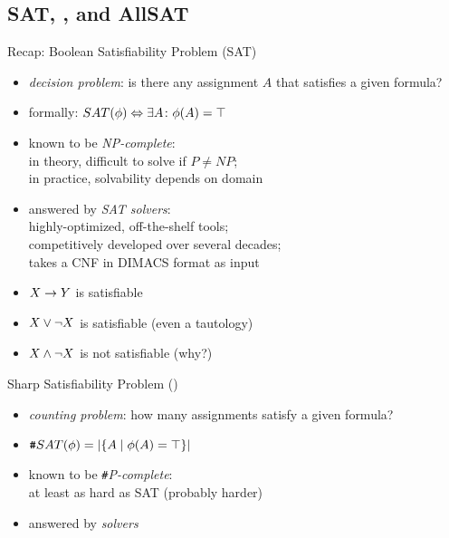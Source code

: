 \subsection{SAT, \ssat{}, and AllSAT}

\begin{frame}{\myframetitle}
	\begin{mycolumns}
		\begin{definition}{Recap: Boolean Satisfiability Problem (SAT)}
			\begin{itemize}
				\item \emph{decision problem}: is there any assignment $A$ that satisfies a given formula?
				\item formally: $SAT(\phi) \Leftrightarrow \exists A \colon \phi(A) = \top$
				\item known to be \emph{NP-complete}:\\
					in theory, difficult to solve if $P \neq NP$;\\
					in practice, solvability depends on domain
				\item answered by \emph{SAT solvers}:\\
					highly-optimized, off-the-shelf tools;\\
					competitively developed over several decades;\\
					takes a CNF in DIMACS format as input
			\end{itemize}
		\end{definition}
		\begin{example}{}
			\begin{itemize}
				\item $X \rightarrow Y$ is satisfiable
				\item $X \vee \neg X$ is satisfiable (even a tautology)
				\item $X \wedge \neg X$ is not satisfiable (why?)
			\end{itemize}
		\end{example}
	\mynextcolumn
		\begin{definition}{Sharp Satisfiability Problem (\ssat{})}
			\begin{itemize}
				\item \emph{counting problem}: how many assignments satisfy a given formula?
				\item $\texttt{\#}SAT(\phi) = \lvert\{A \mid \phi(A) = \top\}\rvert$
				\item known to be \emph{\texttt{\#}P-complete}:\\
					at least as hard as SAT (probably harder)
				\item answered by \emph{\ssat{} solvers}

\end{itemize}
\end{definition}
\end{mycolumns}
\end{frame}
